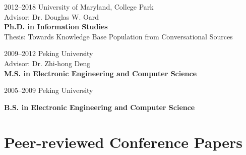 \documentclass[a4paper, 11pt]{article}
\begin{document}
\begin{CV}
\item[2012--2018] University of Maryland, College Park\\
Advisor: Dr. Douglas W. Oard\\
\textbf{Ph.D. in Information Studies}\\
Thesis: Towards Knowledge Base Population from Conversational Sources
\vspace{2mm}

\item[2009--2012] Peking University\\
 Advisor: Dr. Zhi-hong Deng\\
\textbf{M.S. in Electronic Engineering and Computer Science}
\vspace{2mm}

\item[2005--2009] Peking University

\textbf{B.S. in Electronic Engineering and Computer Science}
\end{CV}
\vspace{-1mm}









\vspace{-1mm}
\section{Peer-reviewed Conference Papers}
\end{document}
